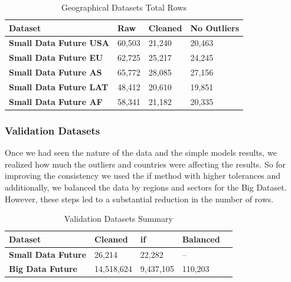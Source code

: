 \documentclass[11pt,english,a4paper,hidelinks]{book}
\begin{document}
\begin{table}[H]
    \centering
    \caption{Geographical Datasets Total Rows}
    \begin{tabular}{|l|l|l|l|}
        \hline  
        \textbf{Dataset} & \textbf{Raw} & \textbf{Cleaned} & \textbf{No Outliers} \\
        \hline
        \textbf{Small Data Future USA} & 60,503 & 21,240 & 20,463 \\
        \hline
        \textbf{Small Data Future EU} & 62,725 & 25,217 & 24,245 \\
        \hline        
        \textbf{Small Data Future AS} & 65,772 & 28,085 & 27,156\\
        \hline
        \textbf{Small Data Future LAT} & 48,412 & 20,610 & 19,851 \\
        \hline
        \textbf{Small Data Future AF} & 58,341 & 21,182 & 20,335 \\
        \hline
        \end{tabular}
    \label{tab:geographical_datasets_rows}
\end{table}

\subsubsection{Validation Datasets}

\noindent  Once we had seen the nature of the data and the simple models results, we realized how much the outliers and countries were affecting the results. So for improving the consistency we used the \acrshort{if} method with higher tolerances and additionally, we balanced the data by regions and sectors for the Big Dataset. However, these steps led to a substantial reduction in the number of rows. 

\begin{table}[H]
    \centering
    \caption{Validation Datasets Summary}
    \begin{tabular}{|l|l|l|l|l|}
        \hline  
        \textbf{Dataset} & \textbf{Cleaned} & \textbf{ \acrshort{if}} & \textbf{{Balanced}} \\
        \hline
        \textbf{Small Data Future} & 26,214 & 22,282 & -- \\
        \hline
        \textbf{Big Data Future} & 14,518,624 & 9,437,105 & 110,203 \\
        \hline
        \end{tabular}
    \label{tab:validation_datasets_summary}
\end{table}
\end{document}
